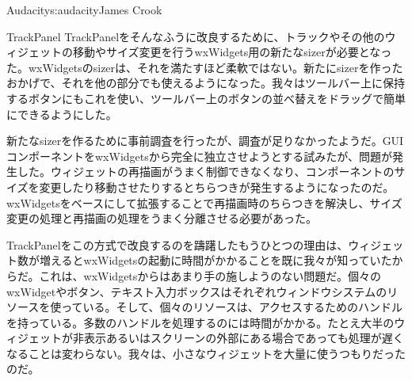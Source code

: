 \begin{aosachapter}{Audacity}{s:audacity}{James Crook}
\begin{aosasect1}{TrackPanel}
TrackPanelをそんなふうに改良するために、トラックやその他のウィジェットの移動やサイズ変更を行うwxWidgets用の新たなsizerが必要となった。wxWidgetsのsizerは、それを満たすほど柔軟ではない。新たにsizerを作ったおかげで、それを他の部分でも使えるようになった。我々はツールバー上に保持するボタンにもこれを使い、ツールバー上のボタンの並べ替えをドラッグで簡単にできるようにした。

新たなsizerを作るために事前調査を行ったが、調査が足りなかったようだ。GUIコンポーネントをwxWidgetsから完全に独立させようとする試みたが、問題が発生した。ウィジェットの再描画がうまく制御できなくなり、コンポーネントのサイズを変更したり移動させたりするとちらつきが発生するようになったのだ。wxWidgetsをベースにして拡張することで再描画時のちらつきを解決し、サイズ変更の処理と再描画の処理をうまく分離させる必要があった。

TrackPanelをこの方式で改良するのを躊躇したもうひとつの理由は、ウィジェット数が増えるとwxWidgetsの起動に時間がかかることを既に我々が知っていたからだ。これは、wxWidgetsからはあまり手の施しようのない問題だ。個々のwxWidgetやボタン、テキスト入力ボックスはそれぞれウィンドウシステムのリソースを使っている。そして、個々のリソースは、アクセスするためのハンドルを持っている。多数のハンドルを処理するのには時間がかかる。たとえ大半のウィジェットが非表示あるいはスクリーンの外部にある場合であっても処理が遅くなることは変わらない。我々は、小さなウィジェットを大量に使うつもりだったのだ。


\end{aosasect1}
\end{aosachapter}
